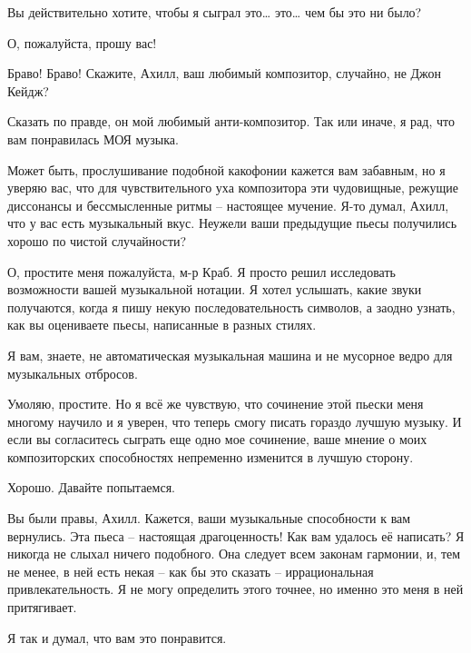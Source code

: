 \documentclass[../main.tex]{subfiles}
\begin{document}
\begin{dialogue}
Вы действительно хотите, чтобы я сыграл это\ldots{} это\ldots{} чем бы это ни было?

 О, пожалуйста, прошу вас!


 Браво! Браво! Скажите, Ахилл, ваш любимый композитор, случайно, не Джон Кейдж?

 Сказать по правде, он мой любимый анти-композитор. Так или иначе, я рад, что вам понравилась МОЯ музыка.

 Может быть, прослушивание подобной какофонии кажется вам забавным, но я уверяю вас, что для чувствительного уха композитора эти чудовищные, режущие диссонансы и бессмысленные ритмы \--- настоящее мучение. Я-то думал, Ахилл, что у вас есть музыкальный вкус. Неужели ваши предыдущие пьесы получились хорошо по чистой случайности?

 О, простите меня пожалуйста, м-р Краб. Я просто решил исследовать возможности вашей музыкальной нотации. Я хотел услышать, какие звуки получаются, когда я пишу некую последовательность символов, а заодно узнать, как вы оцениваете пьесы, написанные в разных стилях.

 Я вам, знаете, не автоматическая музыкальная машина и не мусорное ведро для музыкальных отбросов.

 Умоляю, простите. Но я всё же чувствую, что сочинение этой пьески меня многому научило и я уверен, что теперь смогу писать гораздо лучшую музыку. И если вы согласитесь сыграть еще одно мое сочинение, ваше мнение о моих композиторских способностях непременно изменится в лучшую сторону.

 Хорошо. Давайте попытаемся.


Вы были правы, Ахилл. Кажется, ваши музыкальные способности к вам вернулись. Эта пьеса \--- настоящая драгоценность! Как вам удалось её написать? Я никогда не слыхал ничего подобного. Она следует всем законам гармонии, и, тем не менее, в ней есть некая \--- как бы это сказать \--- иррациональная привлекательность. Я не могу определить этого точнее, но именно это меня в ней притягивает.

 Я так и думал, что вам это понравится.


\end{dialogue}
\end{document}
